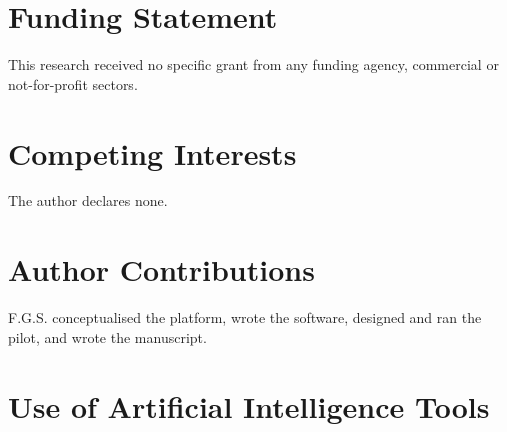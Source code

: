 \section*{Funding Statement}

This research received no specific grant from any funding agency, commercial or
not-for-profit sectors.

\section*{Competing Interests}

The author declares none.

\section*{Author Contributions}

F.G.S. conceptualised the platform, wrote the software, designed and ran the
pilot, and wrote the manuscript.

\section*{Use of Artificial Intelligence Tools}

